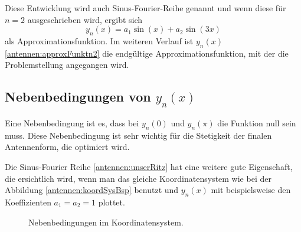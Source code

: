 Diese Entwicklung wird auch Sinus-Fourier-Reihe genannt
und wenn diese für $n=2$ ausgeschrieben wird, ergibt sich
\begin{equation}
	y_n(x)
	=
	a_1\sin(x)+a_2\sin(3x)
	\label{antennen:approxFunktn2}
\end{equation}
als Approximationsfunktion. Im weiteren Verlauf ist $y_n(x)$ \eqref{antennen:approxFunktn2} 
die endgültige Approximationsfunktion, mit der die Problemstellung angegangen wird.

\subsection{Nebenbedingungen von $y_n(x)$\label{antennen:nebenbedRitz}}

Eine Nebenbedingung ist es, dass bei $y_n(0)$ und $y_n(\pi)$ die Funktion null sein muss.
Diese Nebenbedingung ist sehr wichtig für die Stetigkeit der finalen Antennenform, die optimiert wird.

Die Sinus-Fourier Reihe \eqref{antennen:unserRitz} hat eine weitere gute Eigenschaft, 
die ersichtlich wird, wenn man das gleiche Koordinatensystem wie bei der Abbildung \ref{antennen:koordSysBsp}
benutzt und $y_n(x)$ mit beispielsweise den Koeffizienten $a_1=a_2=1$ plottet.

\begin{figure}
	\centering
	\caption{Nebenbedingungen im Koordinatensystem.}
	\label{antennen:nebenbedGrafik}
\end{figure}

